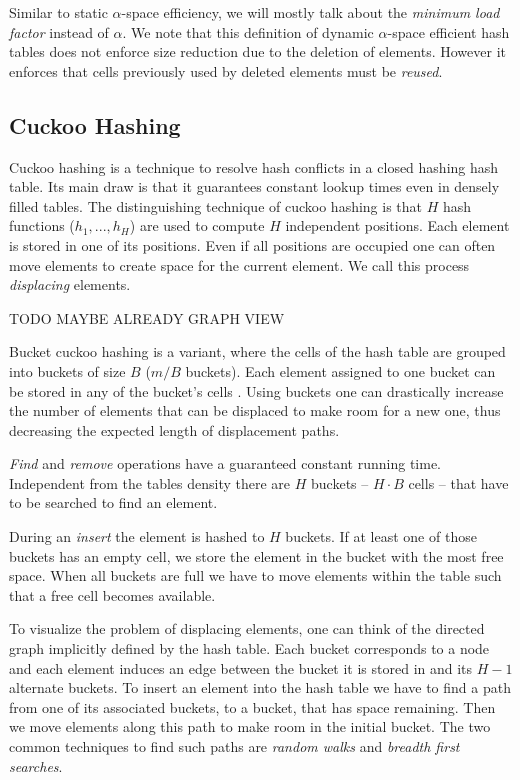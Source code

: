 \documentclass[a4paper,UKenglish]{lipics-v2016}
\begin{document}
Similar to static $\alpha$-space efficiency, we will mostly talk about
the \emph{minimum load factor} instead of $\alpha$.  We note that this
definition of dynamic $\alpha$-space efficient hash tables does not
enforce size reduction due to the deletion of elements. However it
enforces that cells previously used by deleted elements must be
\emph{reused}.

\subsection{Cuckoo Hashing}
\label{sec:pre_cuckoo}
Cuckoo hashing is a technique to resolve hash conflicts in a closed
hashing hash table. Its main draw is that it guarantees constant
lookup times even in densely filled tables.  The distinguishing
technique of cuckoo hashing is that $H$ hash functions ($h_1, ... ,
h_H$) are used to compute $H$ independent positions. Each element is
stored in one of its positions.  Even if all positions are occupied
one can often move elements to create space for the current
element. We call this process \emph{displacing} elements.

TODO MAYBE ALREADY GRAPH VIEW

Bucket cuckoo hashing is a variant, where the cells of the hash table
are grouped into buckets of size $B$ ($m/B$ buckets).  Each element
assigned to one bucket can be stored in any of the bucket's cells .
Using buckets one can drastically increase the number of elements that
can be displaced to make room for a new one, thus decreasing the
expected length of displacement paths.

\emph{Find} and \emph{remove} operations have a guaranteed constant
running time. Independent from the tables density there are $H$
buckets -- $H\cdot B$ cells -- that have to be searched to find an
element.

During an \emph{insert} the element is hashed to $H$ buckets.  If at least
one of those buckets has an empty cell, we store the element in the
bucket with the most free space.  When all buckets are full we
have to move elements within the table such that a free cell becomes
available.

\label{sec:cuckoo_graph}
To visualize the problem of displacing elements, one can think of the
directed graph implicitly defined by the hash table.  Each bucket
corresponds to a node and each element induces an edge between
the bucket it is stored in and its $H-1$ alternate buckets.  To insert
an element into the hash table we have to find a path from one of its
associated buckets, to a bucket, that has space remaining.  Then we
move elements along this path to make room in the initial bucket.
The two common techniques to find such paths are \emph{random walks} and
\emph{breadth first searches}.
\end{document}
